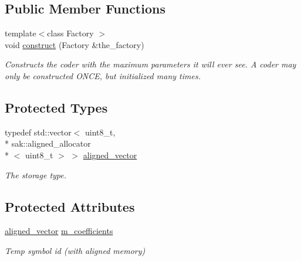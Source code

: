\subsection*{Public Member Functions}
\begin{DoxyCompactItemize}
\item 
{\footnotesize template$<$class Factory $>$ }\\void \hyperlink{classkodo_1_1aligned__coefficients__buffer_a424523156543710afd6a4e87c84e8c76}{construct} (Factory \&the\-\_\-factory)
\begin{DoxyCompactList}\small\item\em Constructs the coder with the maximum parameters it will ever see. A coder may only be constructed O\-N\-C\-E, but initialized many times. \end{DoxyCompactList}\end{DoxyCompactItemize}
\subsection*{Protected Types}
\begin{DoxyCompactItemize}
\item 
\hypertarget{classkodo_1_1aligned__coefficients__buffer_a055b8fdec9a3f1bfbfe1d3e429bb7d33}{typedef std\-::vector$<$ uint8\-\_\-t, \\*
sak\-::aligned\-\_\-allocator\\*
$<$ uint8\-\_\-t $>$ $>$ \hyperlink{classkodo_1_1aligned__coefficients__buffer_a055b8fdec9a3f1bfbfe1d3e429bb7d33}{aligned\-\_\-vector}}\label{classkodo_1_1aligned__coefficients__buffer_a055b8fdec9a3f1bfbfe1d3e429bb7d33}

\begin{DoxyCompactList}\small\item\em The storage type. \end{DoxyCompactList}\end{DoxyCompactItemize}
\subsection*{Protected Attributes}
\begin{DoxyCompactItemize}
\item 
\hypertarget{classkodo_1_1aligned__coefficients__buffer_ac2930a2afae8407244486e0f9a2ba787}{\hyperlink{classkodo_1_1aligned__coefficients__buffer_a055b8fdec9a3f1bfbfe1d3e429bb7d33}{aligned\-\_\-vector} \hyperlink{classkodo_1_1aligned__coefficients__buffer_ac2930a2afae8407244486e0f9a2ba787}{m\-\_\-coefficients}}\label{classkodo_1_1aligned__coefficients__buffer_ac2930a2afae8407244486e0f9a2ba787}

\begin{DoxyCompactList}\small\item\em Temp symbol id (with aligned memory) \end{DoxyCompactList}\end{DoxyCompactItemize}


